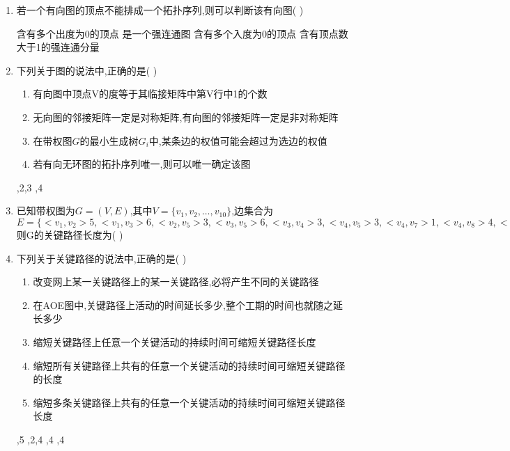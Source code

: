 \documentclass[12pt, a4paper, oneside, UTF8]{ctexbook}
\begin{document}
\begin{enumerate}
    \item 若一个有向图的顶点不能排成一个拓扑序列,则可以判断该有向图(    ) 
    \begin{choices}[2]
        \task 含有多个出度为0的顶点
        \task 是一个强连通图
        \task 含有多个入度为0的顶点
        \task 含有顶点数大于1的强连通分量 
    \end{choices}


    \item 下列关于图的说法中,正确的是(   ) 
    \begin{enumerate}
        \item [(1)] 有向图中顶点V的度等于其临接矩阵中第V行中1的个数
        \item [(2)] 无向图的邻接矩阵一定是对称矩阵,有向图的邻接矩阵一定是非对称矩阵
        \item [(3)] 在带权图$G$的最小生成树$G_i$中,某条边的权值可能会超过为选边的权值
        \item [(4)] 若有向无环图的拓扑序列唯一,则可以唯一确定该图 
    \end{enumerate}
    \begin{choices}
        ,2,3
        ,4
    \end{choices}


    \item 已知带权图为$G=(V,E)$,其中$V=\{v_1,v_2,\ldots,v_{10}\}$,边集合为$E=\{<v_1,v_2>5,
    <v_1,v_3>6,<v_2,v_5>3,<v_3,v_5>6,<v_3,v_4>3,<v_4,v_5>3,<v_4,v_7>1,<v_4,v_8>4,<v_5,v_6>4,
    <v_5,v_7>2,<v_6,v_{10}>4,<v_7,v_9>5,<v_8,v_9>2,<v_9,v_{10}>2\}$则G的关键路径长度为(   ) 



    \item 下列关于关键路径的说法中,正确的是(   ) 
    \begin{enumerate}
        \item [(1)]改变网上某一关键路径上的某一关键路径,必将产生不同的关键路径
        \item [(2)]在AOE图中,关键路径上活动的时间延长多少,整个工期的时间也就随之延长多少
        \item [(3)]缩短关键路径上任意一个关键活动的持续时间可缩短关键路径长度
        \item [(4)]缩短所有关键路径上共有的任意一个关键活动的持续时间可缩短关键路径的长度
        \item [(5)]缩短多条关键路径上共有的任意一个关键活动的持续时间可缩短关键路径长度 
    \end{enumerate}
    \begin{choices}
        ,5
        ,2,4
        ,4
        ,4
    \end{choices}



\end{enumerate}
\end{document}
